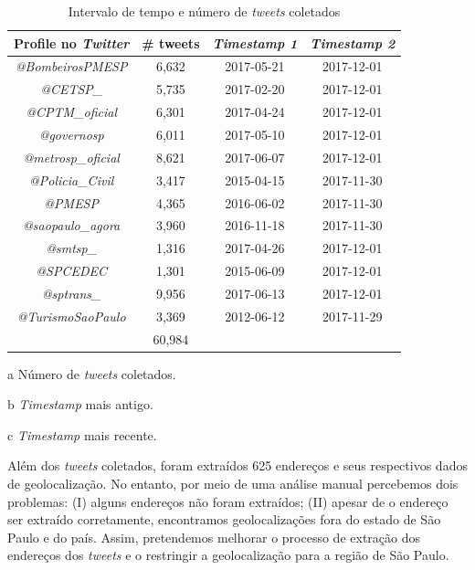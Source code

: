 \documentclass[
	12pt,				%
	oneside,			%
	a4paper,			%
	english,			%
	brazil				%
	]{abntex2ppgsi}
\begin{document}
{{\begin{table}[!htb]
\centering
\caption{Intervalo de tempo e número de \textit{tweets} coletados}
	\label{tab:tweetsCollected}
\begin{threeparttable}
\begin{tabular}{c|c|c|c}
\toprule
\textbf {Profile no \textit{Twitter}} &\textbf{ \# tweets \tnote{a}}  &\textbf{ \textit{Timestamp 1 \tnote{b}}} & \textbf{\textit{Timestamp 2 \tnote{c}}} \\ 
\midrule
\textit{@BombeirosPMESP} & 6,632 & 2017-05-21 & 2017-12-01 \\
\hline
\textit{@CETSP\_} & 5,735 & 2017-02-20  & 2017-12-01 \\
\hline
\textit{@CPTM\_oficial} & 6,301 & 2017-04-24 & 2017-12-01 \\
\hline
\textit{@governosp}  & 6,011 & 2017-05-10 & 2017-12-01 \\
\hline
\textit{@metrosp\_oficial} & 8,621 & 2017-06-07 & 2017-12-01 \\
\hline
\textit{@Policia\_Civil}  & 3,417 & 2015-04-15 & 2017-11-30 \\
\hline
\textit{@PMESP}  & 4,365 & 2016-06-02 & 2017-11-30 \\
\hline
\textit{@saopaulo\_agora}  & 3,960 & 2016-11-18 & 2017-11-30 \\
\hline
\textit{@smtsp\_} & 1,316 & 2017-04-26 & 2017-12-01 \\
\hline
\textit{@SPCEDEC} & 1,301 & 2015-06-09 & 2017-12-01 \\
\hline
\textit{@sptrans\_} & 9,956 & 2017-06-13 & 2017-12-01 \\
\hline
\textit{@TurismoSaoPaulo} & 3,369 & 2012-06-12 & 2017-11-29 \\
\midrule
\textbf {} & 60,984 & {} & {} \\
\bottomrule
\end{tabular}
\begin{tablenotes}
            \item[a] Número de \textit{tweets} coletados.
            \item[b] \textit{Timestamp} mais antigo.
            \item[c] \textit{Timestamp} mais recente.
        \end{tablenotes}
\end{threeparttable}
\end{table}

Além dos \textit{tweets} coletados, foram extraídos 625 endereços e seus respectivos dados de geolocalização. No entanto, por meio de uma análise manual percebemos dois problemas: (I) alguns endereços não foram extraídos; (II) apesar de o endereço ser extraído corretamente, encontramos geolocalizações fora do estado de São Paulo e do país. Assim, pretendemos melhorar o processo de extração dos endereços dos \textit{tweets} e o restringir a geolocalização para a região de São Paulo. 

}}
\end{document}
